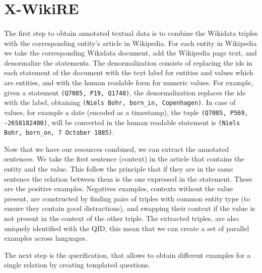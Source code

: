 
\section{X-WikiRE}
\paragraph{}
The first step to obtain annotated textual data is to combine the Wikidata triples with the corresponding entity's article in Wikipedia. For each entity in Wikipedia we  take  the  corresponding  Wikidata  document, add  the  Wikipedia  page  text,  and  denormalize the  statements. The denormalization consists  of  replacing  the ids in  each  statement  of  the document with the text label for entities and values which are entities,  and  with  the  human  readable  form  for numeric values. For example, given a statement \texttt{(Q7085, P19, Q1748)}, the denormalization replaces the ids with the label, obtaining \texttt{(Niels Bohr, born\_in, Copenhagen)}. In case of values, for example a date (encoded as a timestamp), the tuple \texttt{(Q7085, P569, -2658182400)}, will be converted in the human readable statement is \texttt{(Niels Bohr, born\_on, 7 October 1885)}. 

Now that we have our resources combined, we can extract the annotated sentences. We take the first sentence (context) in the article that contains the entity and the value. This follow the principle that if they are in the same sentence the relation between them is the one expressed in the statement. These are the positive examples. Negatives examples, contexts without the value present, are constructed by finding pairs of triples with common entity type (to ensure they contain good distractions), and swapping their context if the value is not present in the context of the other triple. The extracted triples, are also uniquely identified with the QID, this mean that we can create a set of parallel examples across languages. 

The next step is the querification, that allows to obtain different examples for a single relation by creating templated questions.

